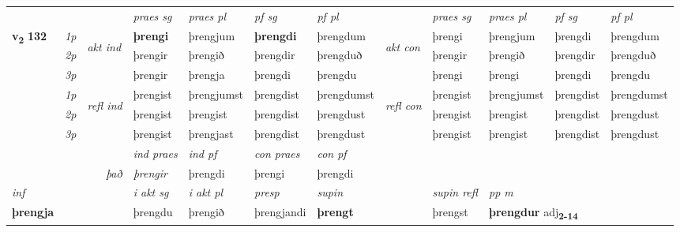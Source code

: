 \begin{longtable}[l]{X>{\footnotesize\itshape}llXXXXlXXXX}
 & &   & \textit{praes sg}  & \textit{praes pl}    & \textit{ pf sg} & \textit{pf pl} & & \textit{praes sg}  & \textit{praes pl}    & \textit{pf sg} & \textit{pf pl }  \\ \cmidrule{4-7} \cmidrule{9-12}
 \multirow{2}{*}{{{\textbf{v{\textsubscript{2}}} \Large{\textbf{132}}}}}  & 1p & \multirow{3}{*}{\begin{turn}{90}\textit{akt ind}\end{turn}} & \textbf{þrengi} & þrengjum & \textbf{þrengdi} & þrengdum & \multirow{3}{*}{\begin{turn}{90}\textit{akt con}\end{turn}} &þrengi & þrengjum & þrengdi & þrengdum\\*
 & 2p &  &  þrengir  & þrengið & þrengdir & þrengduð & & þrengir & þrengið & þrengdir & þrengduð \\*
 & 3p &  & þrengir & þrengja & þrengdi & þrengdu & & þrengi & þrengi& þrengdi & þrengdu \\*
\cmidrule{4-7} \cmidrule{9-12}
 & 1p & \multirow{3}{*}{\begin{turn}{90}\textit{refl ind}\end{turn}}  & þrengist & þrengjumst & þrengdist & þrengdumst & \multirow{3}{*}{\begin{turn}{90}\textit{refl con}\end{turn}}  &þrengist & þrengjumst & þrengdist & þrengdumst \\*
 & 2p &  & þrengist & þrengist & þrengdist & þrengdust & &þrengist & þrengist & þrengdist & þrengdust \\*
 & 3p  & & þrengist & þrengjast & þrengdist & þrengdust & & þrengist & þrengist& þrengdist & þrengdust \\*
\cmidrule{4-7} \cmidrule{9-12}

   && &  \textit{ind praes} & \textit{ind pf} & \textit{con praes} & \textit{con pf} \\*
\multicolumn{3}{r}{\textit{það}} & þrengir & þrengdi & þrengi & þrengdi \\*

\cmidrule{4-7}
   {\textit{inf}} & &  & \textit{i akt sg} & \textit{i akt pl}   & \textit{presp} & \textit{supin} && \textit{supin refl} & \textit{pp m} \\*
  {\textbf{þrengja}} & && þrengdu  & þrengið   & þrengjandi &  \textbf{þrengt} && þrengst & \multicolumn{2}{l}{\textbf{þrengdur} adj\textbf{\textsubscript{2-14}}} \\*


\end{longtable}
